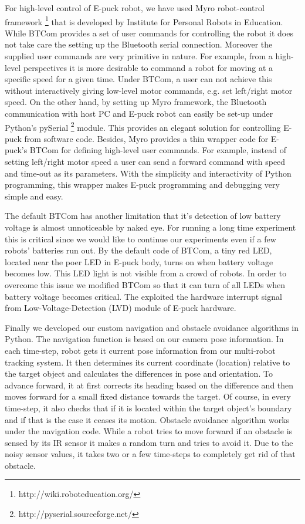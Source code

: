 For high-level control of E-puck robot, we have used Myro robot-control framework \footnote{http://wiki.roboteducation.org/} that is developed by Institute for Personal Robots in Education. While BTCom provides a set of user commands for controlling the robot it does not take care the setting up the Bluetooth serial connection. Moreover the supplied user commands are very primitive in nature. For example, from a high-level perspectives it is more desirable to command a robot for moving at a specific speed for a given time. Under BTCom, a user can not achieve this without interactively giving low-level motor commands, e.g. set left/right motor speed.  On the other hand, by setting up Myro framework, the Bluetooth communication with host PC and E-puck robot can easily be set-up under Python's pySerial \footnote{http://pyserial.sourceforge.net/} module. This provides an elegant solution for controlling E-puck from software code. Besides, Myro provides a thin wrapper code for E-puck's BTCom for defining high-level user commands. For example, instead of setting left/right motor speed a user can send a forward command with  speed and time-out as its parameters. With the simplicity and interactivity of Python programming, this wrapper makes E-puck programming and debugging very simple and easy. 

The default BTCom has another limitation that it's detection of low battery voltage is almost unnoticeable by naked eye. For running a long time experiment this is critical since we would like to continue our experiments even if a few robots' batteries run out. By the default code of BTCom, a tiny red LED, located near the poer LED in E-puck body, turns on when battery voltage becomes low. This LED light is not visible from a crowd of robots. In order to overcome this issue we modified BTCom so that it can turn of all LEDs when battery voltage becomes critical. The exploited the hardware interrupt signal from Low-Voltage-Detection (LVD) module of E-puck hardware.

Finally we developed our custom navigation and obstacle avoidance algorithms in Python. The navigation function is based on our camera pose information. In each time-step,  robot gets it current pose information from our multi-robot tracking system. It then determines its current coordinate (location) relative to the target object and calculates the differences in pose and orientation. To advance forward, it at first corrects its heading based on the difference and then moves forward for a small fixed distance towards the target. Of course, in every time-step, it also checks that if it is located within the target object's boundary and if that is the case it ceases its motion. Obstacle avoidance algorithm works under the navigation code. While a robot tries to move forward if an obstacle is sensed by its IR sensor it makes a random turn and tries to avoid it. Due to the noisy sensor values, it takes two or a few time-steps to completely get rid of that obstacle. 
